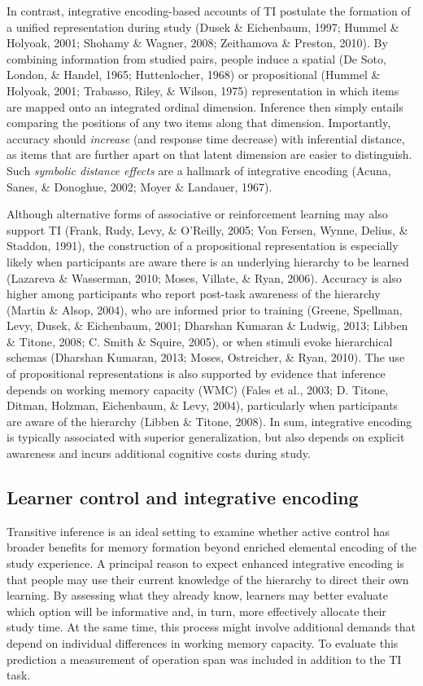 \documentclass[floatsintext,man]{apa6}
\theoremstyle{definition}
\theoremstyle{definition}
\theoremstyle{definition}
\theoremstyle{remark}
\begin{document}
In contrast, integrative encoding-based accounts of TI postulate the
formation of a unified representation during study (Dusek \& Eichenbaum,
1997; Hummel \& Holyoak, 2001; Shohamy \& Wagner, 2008; Zeithamova \&
Preston, 2010). By combining information from studied pairs, people
induce a spatial (De Soto, London, \& Handel, 1965; Huttenlocher, 1968)
or propositional (Hummel \& Holyoak, 2001; Trabasso, Riley, \& Wilson,
1975) representation in which items are mapped onto an integrated
ordinal dimension. Inference then simply entails comparing the positions
of any two items along that dimension. Importantly, accuracy should
\emph{increase} (and response time decrease) with inferential distance,
as items that are further apart on that latent dimension are easier to
distinguish. Such \emph{symbolic distance effects} are a hallmark of
integrative encoding (Acuna, Sanes, \& Donoghue, 2002; Moyer \&
Landauer, 1967).

Although alternative forms of associative or reinforcement learning may
also support TI (Frank, Rudy, Levy, \& O'Reilly, 2005; Von Fersen,
Wynne, Delius, \& Staddon, 1991), the construction of a propositional
representation is especially likely when participants are aware there is
an underlying hierarchy to be learned (Lazareva \& Wasserman, 2010;
Moses, Villate, \& Ryan, 2006). Accuracy is also higher among
participants who report post-task awareness of the hierarchy (Martin \&
Alsop, 2004), who are informed prior to training (Greene, Spellman,
Levy, Dusek, \& Eichenbaum, 2001; Dharshan Kumaran \& Ludwig, 2013;
Libben \& Titone, 2008; C. Smith \& Squire, 2005), or when stimuli evoke
hierarchical schemas (Dharshan Kumaran, 2013; Moses, Ostreicher, \&
Ryan, 2010). The use of propositional representations is also supported
by evidence that inference depends on working memory capacity (WMC)
(Fales et al., 2003; D. Titone, Ditman, Holzman, Eichenbaum, \& Levy,
2004), particularly when participants are aware of the hierarchy (Libben
\& Titone, 2008). In sum, integrative encoding is typically associated
with superior generalization, but also depends on explicit awareness and
incurs additional cognitive costs during study.

\subsection{Learner control and integrative
encoding}\label{learner-control-and-integrative-encoding}

Transitive inference is an ideal setting to examine whether active
control has broader benefits for memory formation beyond enriched
elemental encoding of the study experience. A principal reason to expect
enhanced integrative encoding is that people may use their current
knowledge of the hierarchy to direct their own learning. By assessing
what they already know, learners may better evaluate which option will
be informative and, in turn, more effectively allocate their study time.
At the same time, this process might involve additional demands that
depend on individual differences in working memory capacity. To evaluate
this prediction a measurement of operation span was included in addition
to the TI task.
\end{document}
